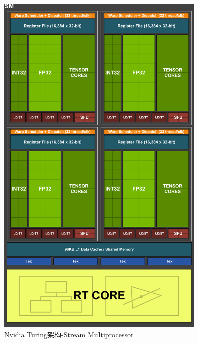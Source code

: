\documentclass[UTF8]{ctexart}
\begin{document}
\begin{figure}[H]
  \includegraphics[width=10cm]{nvidia_turing1.png}
  \centering
  \caption{Nvidia Turing架构-Stream Multiprocessor}
  \label{fig:nvidia_turing_SM}
\end{figure}
\end{document}
